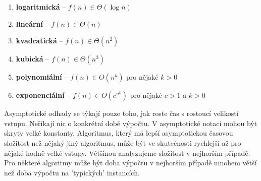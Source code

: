 \begin{enumerate}
\item \textbf{logaritmická} -- $f(n) \in \Theta(\log n)$
\item \textbf{lineární} -- $f(n) \in \Theta(n)$
\item \textbf{kvadratická} -- $f(n) \in \Theta(n^2)$
\item \textbf{kubická} -- $f(n) \in \Theta(n^3)$
\item \textbf{polynomiální} -- $f(n) \in O(n^k)$ pro nějaké $k > 0$
\item \textbf{exponenciální} -- $f(n) \in O(c^{n^k})$ pro nějaké $c > 1$ a $k > 0$
\end{enumerate}

Asymptotické odhady se týkají pouze toho, jak roste čas s rostoucí velikostí vstupu. Neříkají nic o konkrétní době výpočtu. V asymptotické notaci mohou být skryty velké konstanty. Algoritmus, který má lepší asymptotickou časovou složitost než nějaký jiný algoritmus, může být ve skutečnosti rychlejší až pro nějaké hodně velké vstupy. Většinou analyzujeme složitost v nejhorším případě. Pro některé algoritmy může být doba výpočtu v nejhorším případě mnohem větší než doba výpočtu na 'typických' instancích. 
